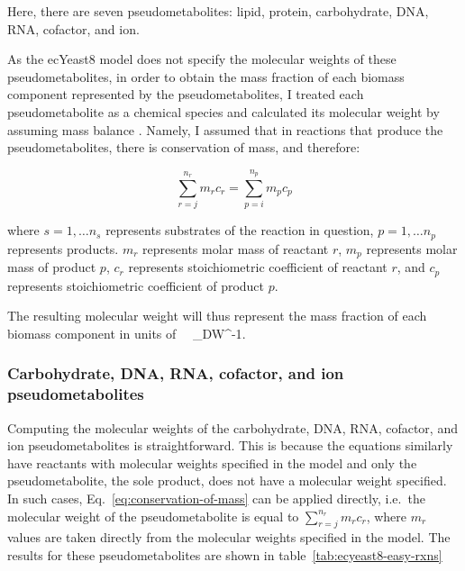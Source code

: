 Here, there are seven pseudometabolites: lipid, protein, carbohydrate, DNA, RNA, cofactor, and ion.

As the ecYeast8 model does not specify the molecular weights of these pseudometabolites, in order to obtain the mass fraction of each biomass component represented by the pseudometabolites,
I treated each pseudometabolite as a chemical species and calculated its molecular weight by assuming mass balance \parencite{chanStandardizingBiomassReactions2017, dinhQuantifyingPropagationParametric2022, takhaveevTemporalSegregationBiosynthetic2023}.
Namely, I assumed that in reactions that produce the pseudometabolites, there is conservation of mass, and therefore:


\begin{equation}
  \sum_{r = j}^{n_{r}}m_{r}c_{r} = \sum_{p = i}^{n_{p}}m_{p}c_{p}
\label{eq:conservation-of-mass}
\end{equation}

where
$s = 1, \ldots n_{s}$ represents substrates of the reaction in question,
$p = 1, \ldots n_{p}$ represents products.
$m_{r}$ represents molar mass of reactant $r$,
$m_{p}$ represents molar mass of product $p$,
$c_{r}$ represents stoichiometric coefficient of reactant $r$, and
$c_{p}$ represents stoichiometric coefficient of product $p$.

The resulting molecular weight will thus represent the mass fraction of each biomass component in units of \SI{}{\gram~\gram_{DW}^{-1}}.


\subsubsection{Carbohydrate, DNA, RNA, cofactor, and ion pseudometabolites}
\label{subsubsec:model-yeast8-molweight-easy}

Computing the molecular weights of the carbohydrate, DNA, RNA, cofactor, and ion pseudometabolites is straightforward.
This is because the equations similarly have reactants with molecular weights specified in the model and only the pseudometabolite, the sole product, does not have a molecular weight specified.
In such cases, Eq.\ \ref{eq:conservation-of-mass} can be applied directly, i.e.\ the molecular weight of the pseudometabolite is equal to $\sum_{r = j}^{n_{r}}m_{r}c_{r}$, where $m_{r}$ values are taken directly from the molecular weights specified in the model.
The results for these pseudometabolites are shown in table~\ref{tab:ecyeast8-easy-rxns}

